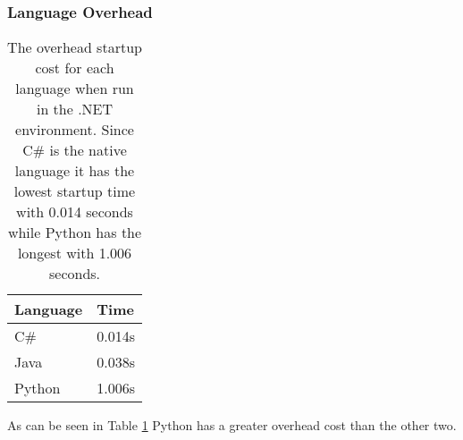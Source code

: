 \subsubsection{Language Overhead} \label{subsec:language_overhead}

\begin{table}[h]
	\begin{center}
		\begin{tabular} { >{\centering\arraybackslash}m{3cm} | >{\centering\arraybackslash}m{2cm}}
			\hline
			\textbf{Language}	& \textbf{Time} \\ \hline
			C\#					& 0.014s \\ \hline
			Java				& 0.038s \\ \hline
			Python				& 1.006s \\ \hline
		\end{tabular}
	\end{center}
	\caption{The overhead startup cost for each language when run in the .NET environment. Since C\# is the native language it has the lowest startup time with 0.014 seconds while Python has the longest with 1.006 seconds.}
	\label{table:language_overhead}
\end{table}

As can be seen in Table \ref{table:language_overhead} Python has a greater overhead cost than the other two.
